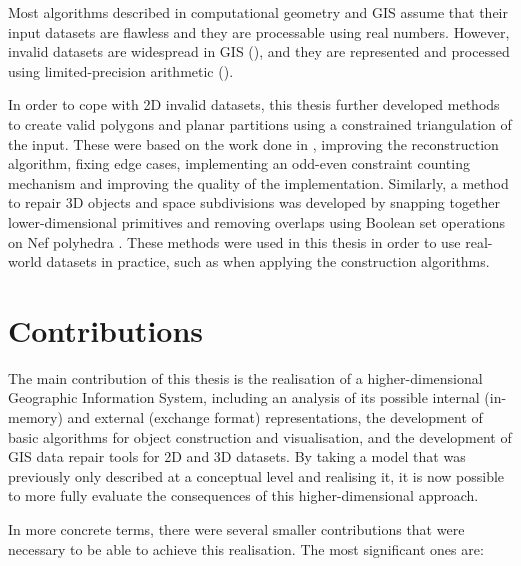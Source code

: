 \begin{description}
Most algorithms described in computational geometry and GIS assume that their input datasets are flawless and they are processable using real numbers.
However, invalid datasets are widespread in GIS (), and they are represented and processed using limited-precision arithmetic ().

In order to cope with 2D invalid datasets, this thesis further developed methods to create valid polygons and planar partitions using a constrained triangulation of the input.
These were based on the work done in \citet{ArroyoOhori10}, improving the reconstruction algorithm, fixing edge cases, implementing an odd-even constraint counting mechanism and improving the quality of the implementation.
Similarly, a method to repair 3D objects and space subdivisions was developed by snapping together lower-dimensional primitives and removing overlaps using Boolean set operations on Nef polyhedra \citep{Bieri88,Hachenberger06}.
These methods were used in this thesis in order to use real-world datasets in practice, such as when applying the construction algorithms.


\end{description}

\section{Contributions}
\label{se:contributions}

The main contribution of this thesis is the realisation of a higher-dimensional Geographic Information System, including an analysis of its possible internal (in-memory) and external (exchange format) representations, the development of basic algorithms for object construction and visualisation, and the development of GIS data repair tools for 2D and 3D datasets.
By taking a model that was previously only described at a conceptual level \citep{vanOosterom10} and realising it, it is now possible to more fully evaluate the consequences of this higher-dimensional approach.

In more concrete terms, there were several smaller contributions that were necessary to be able to achieve this realisation.
The most significant ones are:

